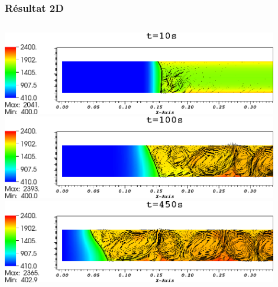 \documentclass{beamer}
\begin{document}
\begin{frame}
    \frametitle{Résultat 2D}
    \footnotesize
\begin{columns}[c]
    \begin{column}{0.5 \textwidth}
\begin{center}
\includegraphics[width=0.9\textwidth]{Figures/CoucheMince0100000.png}\\
\includegraphics[width=0.9\textwidth]{Figures/CoucheMince1000000.png}\\
\includegraphics[width=0.9\textwidth]{Figures/CoucheMince4500000.png}



\end{center}
\end{column}
\end{columns}
\end{frame}
\end{document}

